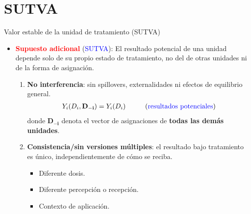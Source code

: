\documentclass[10pt, xcolor=dvipsnames]{beamer}
\begin{document}
\section{SUTVA}

\begin{frame}{Valor estable de la unidad de tratamiento (SUTVA)}
\begin{itemize}
    \item \textcolor{red}{\textbf{Supuesto adicional}} (\textcolor{blue}{SUTVA}): El resultado potencial de una unidad depende solo de su propio estado de tratamiento, no del de otras unidades ni de la forma de asignación. \vspace{1.0em}   
    \begin{enumerate}
        \item \textbf{No interferencia}: sin spillovers, externalidades ni efectos de equilibrio general.
    \begin{align*}
        Y_i(D_i, \mathbf{D_{-i}}) = Y_i(D_i)  \hspace{1cm} \text{(\textcolor{blue}{resultados potenciales})}
    \end{align*}
    donde $\mathbf{D_{-i}}$ denota el vector de asignaciones de \textbf{todas las demás unidades}.
    \vspace{1em}
    \item \textbf{Consistencia/sin versiones múltiples}: el resultado bajo tratamiento es único, independientemente de cómo se reciba.
     \begin{itemize}
         \item Diferente dosis.
         \item Diferente percepción o recepción.
         \item Contexto de aplicación.
     \end{itemize}
    \end{enumerate}
\end{itemize}
\end{frame}
\end{document}
